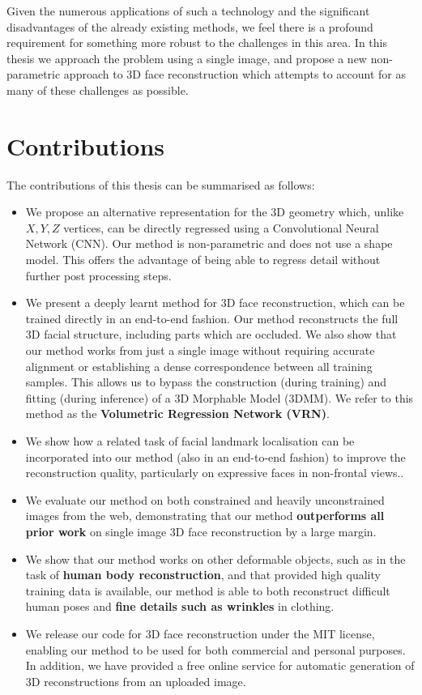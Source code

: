 Given the numerous applications of such a technology and the
significant disadvantages of the already existing methods, we feel
there is a profound requirement for something more robust to the
challenges in this area. In this thesis we approach the problem using
a single image, and propose a new non-parametric approach to 3D face
reconstruction which attempts to account for as many of these
challenges as possible.

\section{Contributions}

The contributions of this thesis can be summarised as follows:

\begin{itemize}
\item %
  We propose an alternative representation for the 3D geometry which,
  unlike $X, Y, Z$ vertices, can be directly regressed using a
  Convolutional Neural Network (CNN). Our method is non-parametric and
  does not use a shape model. This offers the advantage of being able
  to regress detail without further post processing steps.

\item %
  We present a deeply learnt method for 3D face reconstruction, which
  can be trained directly in an end-to-end fashion. Our method
  reconstructs the full 3D facial structure, including parts which are
  occluded. We also show that our method works from just a single
  image without requiring accurate alignment or establishing a dense
  correspondence between all training samples.  This allows us to
  bypass the construction (during training) and fitting (during
  inference) of a 3D Morphable Model (3DMM).  We refer to this method
  as the \textbf{Volumetric Regression Network (VRN)}.

\item We show how a related task of facial landmark localisation can
  be incorporated into our method (also in an end-to-end fashion) to
  improve the reconstruction quality, particularly on expressive faces
  in non-frontal views..

\item We evaluate our method on both constrained and heavily
  unconstrained images from the web, demonstrating that our method
  \textbf{outperforms all prior work} on single image 3D face
  reconstruction by a large margin.

\item We show that our method works on other deformable objects, such
  as in the task of \textbf{human body reconstruction}, and that
  provided high quality training data is available, our method is able
  to both reconstruct difficult human poses and \textbf{fine details
    such as wrinkles} in clothing.

\item We release our code for 3D face reconstruction under the MIT
  license, enabling our method to be used for both commercial and
  personal purposes. In addition, we have provided a free online
  service for automatic generation of 3D reconstructions from an
  uploaded image.
\end{itemize}
